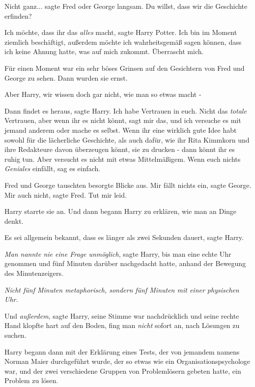 \glqq{}Nicht ganz...\grqq{} sagte Fred oder George langsam. \glqq{}Du willst,
dass wir die Geschichte erfinden?\grqq{}

\glqq{}Ich möchte, dass ihr das \emph{alles} macht\grqq{}, sagte Harry Potter.
\glqq{}Ich bin im Moment ziemlich beschäftigt, außerdem möchte ich
wahrheitsgemäß sagen können, dass ich keine Ahnung hatte, was auf mich zukommt.
Überrascht mich.\grqq{}

Für einen Moment war ein sehr böses Grinsen auf den Gesichtern von Fred und
George zu sehen. Dann wurden sie ernst.

\glqq{}Aber Harry, wir wissen doch gar nicht, wie man so etwas macht -\grqq{}

\glqq{}Dann findet es heraus\grqq{}, sagte Harry. \glqq{}Ich habe Vertrauen in
euch. Nicht das \emph{totale} Vertrauen, aber wenn ihr es nicht könnt, sagt mir
das, und ich versuche es mit jemand anderem oder mache es selbst. Wenn ihr eine
wirklich gute Idee habt sowohl für die lächerliche Geschichte, als auch dafür,
wie ihr Rita Kimmkorn und ihre Redakteure davon überzeugen könnt, sie zu drucken
- dann könnt ihr es ruhig tun. Aber versucht es nicht mit etwas Mittelmäßigem.
Wenn euch nichts \emph{Geniales} einfällt, sag es einfach.\grqq{}

Fred und George tauschten besorgte Blicke aus. \glqq{}Mir fällt nichts
ein\grqq{}, sagte George. \glqq{}Mir auch nicht\grqq{}, sagte Fred. \glqq{}Tut
mir leid.\grqq{}

Harry starrte sie an. Und dann begann Harry zu erklären, wie man an Dinge denkt.

Es sei allgemein bekannt, dass es länger als zwei Sekunden dauert, sagte Harry.

\emph{Man nannte nie eine Frage unmöglich}, sagte Harry, bis man eine echte Uhr
genommen und fünf Minuten darüber nachgedacht hatte, anhand der Bewegung des
Minutenzeigers.

\emph{Nicht fünf Minuten metaphorisch, sondern fünf Minuten mit einer physischen
Uhr.}

Und \emph{außerdem}, sagte Harry, seine Stimme war nachdrücklich und seine
rechte Hand klopfte hart auf den Boden, fing man \emph{nicht} sofort an, nach
Lösungen zu suchen.

Harry begann dann mit der Erklärung eines Tests, der von jemandem namens Norman
Maier durchgeführt wurde, der so etwas wie ein Organisationspsychologe war, und
der zwei verschiedene Gruppen von Problemlösern gebeten hatte, ein Problem zu
lösen.

